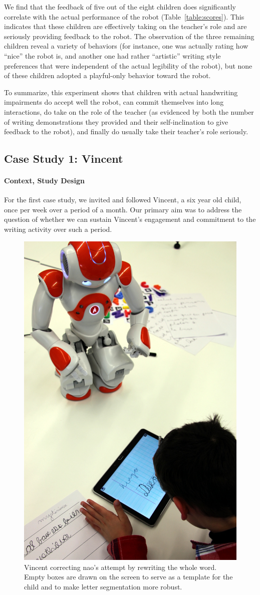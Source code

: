 \documentclass{article}
\begin{document}
We find that the feedback of five out of the eight children does significantly
correlate with the actual performance of the robot (Table~\ref{table:scores}).
This indicates that these children are effectively taking on the teacher's
role and are seriously providing feedback to the robot. The observation of
the three remaining children reveal a variety of behaviors (for instance, one
was actually rating how ``nice'' the robot is, and another one had rather
``artistic'' writing style preferences that were independent of the actual
legibility of the robot), but none of these children adopted a playful-only
behavior toward the robot.

To summarize, this experiment shows that children with actual handwriting
impairments do accept well the robot, can commit themselves into long
interactions, do take on the role of the teacher (as evidenced by both the
number of writing demonstrations they provided and their self-inclination to
give feedback to the robot), and finally do usually take their teacher's role seriously.

\subsection{Case Study 1: Vincent}
\label{vincent}

\paragraph{Context, Study Design}

For the first case study, we invited and followed Vincent, a six year old
child, once per week over a period of a month. Our primary aim was to address
the question of whether we can sustain Vincent's engagement and commitment to
the writing activity over such a period.

\begin{figure}
    \centering
    \includegraphics[width=0.5\linewidth]{diego}
    \caption{\small Vincent correcting {\sc nao}'s attempt by rewriting the
        whole word. Empty boxes are drawn on the screen to serve as a template for the child
        and to make letter segmentation more robust.}
    \label{fig:diego}
\end{figure}
\end{document}
